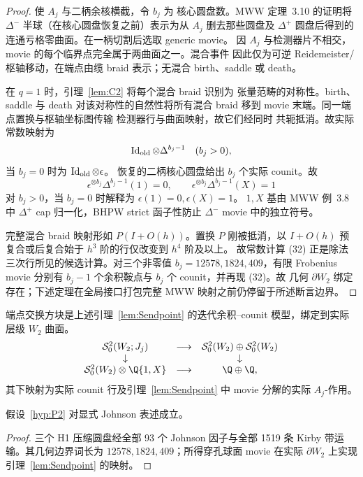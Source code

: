 \begin{proof}
使 \(A_j\) 与二柄余核横截，令 \(b_j\) 为
核心圆盘数。MWW 定理~3.10 的证明将
\(\Delta^-\) 半球（在核心圆盘恢复之前）表示为从 \(A_j\) 删去那些圆盘及
\(\Delta^+\) 圆盘后得到的连通亏格零曲面。在一柄切割后选取 generic movie。
因 \(A_j\) 与检测器片不相交，movie 的每个临界点完全属于两曲面之一。混合事件
因此仅为可逆 Reidemeister/枢轴移动，在端点由缆 braid 表示；无混合 birth、saddle 或 death。

在 \(q=1\) 时，引理~\ref{lem:C2} 将每个混合 braid 识别为
张量范畴的对称性。birth、saddle 与 death
对该对称性的自然性将所有混合 braid 移到 movie 末端。同一端点置换与枢轴坐标图传输
检测器行与曲面映射，故它们经同时
共轭抵消。故实际常数映射为
\[
\operatorname{Id}_{\rm old}\otimes\Delta^{b_j-1}\quad(b_j>0),
\]
当 \(b_j=0\) 时为 \(\operatorname{Id}_{\rm old}\otimes\epsilon\)。
恢复的二柄核心圆盘给出 \(b_j\) 个实际 counit。故
\[
\epsilon^{\otimes b_j}\Delta^{b_j-1}(1)=0,\qquad
\epsilon^{\otimes b_j}\Delta^{b_j-1}(X)=1
\tag{32}
\]
对 \(b_j>0\)，当 \(b_j=0\) 时解释为
\(\epsilon(1)=0,\epsilon(X)=1\)。
\(1,X\) 基由 MWW
例~3.8 中 \(\Delta^+\) cap 归一化，BHPW strict 函子性防止
\(\Delta^-\) movie 中的独立符号。

完整混合 braid 映射形如 \(P(I+O(h))\)。置换
\(P\) 刚被抵消，以 \(I+O(h)\) 预复合或后复合始于
$h^3$ 阶的行仅改变到 $h^4$ 阶及以上。
故常数计算 (32) 正是除法三次行所见的候选计算。对三个非零值
$b_j=12578,1824,409$，有限 Frobenius movie 分别有
$b_j-1$ 个余积鞍点与 $b_j$ 个 counit，并再现 (32)。故
几何 $\partial W_2$ 绑定存在；下述定理在全局接口打包完整 MWW 映射之前仍停留于所述断言边界。
\end{proof}

端点交换方块是上述引理~\ref{lem:Sendpoint} 的迭代余积--counit 模型，绑定到实际层级 $W_2$ 曲面。
\[
\begin{array}{ccc}
\mathcal S^2_0(W_2;J_j)&\longrightarrow&
\mathcal S^2_0(W_2)\oplus\mathcal S^2_0(W_2)\\
\downarrow&&\downarrow\\
\mathcal S^2_0(W_2)\otimes\Q\{1,X\}&\longrightarrow&\Q\oplus\Q,
\end{array}
\]
其下映射为实际 counit 行及引理~\ref{lem:Sendpoint} 中 movie 分解的实际 \(A_j\)-作用。

\begin{theorem}[相对三柄闭包 S]\label{thm:Sdischarge}
假设~\ref{hyp:P2} 对显式 Johnson 表述成立。
\end{theorem}

\begin{proof}
三个 H1 压缩圆盘经全部 93 个 Johnson 因子与全部 1519 条 Kirby 带运输。其几何边界词长为
$12578,1824,409$；所得穿孔球面 movie 在实际 $\partial W_2$ 上实现引理~\ref{lem:Sendpoint} 的映射。
\end{proof}
